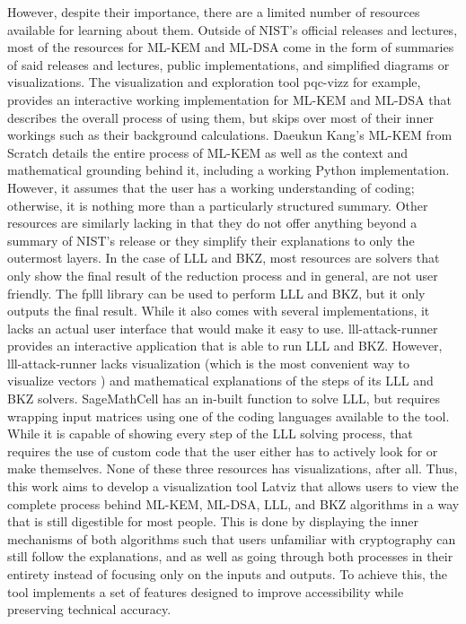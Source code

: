 However, despite their importance, there are a limited number of resources available for learning about them. Outside of NIST’s official releases and lectures, most of the resources for ML-KEM and ML-DSA come in the form of summaries of said releases and lectures, public implementations, and simplified diagrams or visualizations. The visualization and exploration tool pqc-vizz \cite{kalava} for example, provides an interactive working implementation for ML-KEM and ML-DSA that describes the overall process of using them, but skips over most of their inner workings such as their background calculations. Daeukun Kang’s ML-KEM from Scratch \cite{mlkemfromscratch} details the entire process of ML-KEM as well as the context and mathematical grounding behind it, including a working Python implementation. However, it assumes that the user has a working understanding of coding; otherwise, it is nothing more than a particularly structured summary. Other resources are similarly lacking in that they do not offer anything beyond a summary of NIST’s release or they simplify their explanations to only the outermost layers.
In the case of LLL and BKZ, most resources are solvers that only show the final result of the reduction process and in general, are not user friendly. The fplll library \cite{5} can be used to perform LLL and BKZ, but it only outputs the final result. While it also comes with several implementations, it lacks an actual user interface that would make it easy to use. lll-attack-runner \cite{6} provides an interactive application that is able to run LLL and BKZ. However, lll-attack-runner lacks visualization (which is the most convenient way to visualize vectors \cite{15}) and mathematical explanations of the steps of its LLL and BKZ solvers. SageMathCell \cite{7} has an in-built function to solve LLL, but requires wrapping input matrices using one of the coding languages available to the tool. While it is capable of showing every step of the LLL solving process, that requires the use of custom code that the user either has to actively look for or make themselves. None of these three resources has visualizations, after all.
Thus, this work aims to develop a visualization tool Latviz that allows users to view the complete process behind ML-KEM, ML-DSA, LLL, and BKZ algorithms in a way that is still digestible for most people. This is done by displaying the inner mechanisms of both algorithms such that users unfamiliar with cryptography can still follow the explanations, and as well as going through both processes in their entirety instead of focusing only on the inputs and outputs. To achieve this, the tool implements a set of features designed to improve accessibility while preserving technical accuracy.
